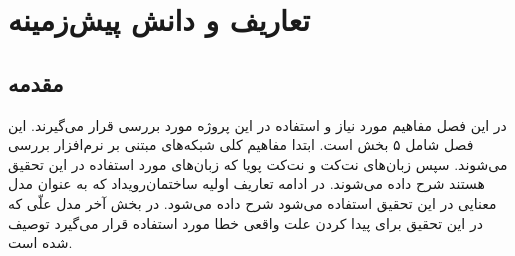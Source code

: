 \chapter{تعاریف و دانش پیش‌زمینه}
\section{مقدمه}
در این فصل مفاهیم مورد نیاز و استفاده در این پروژه مورد بررسی قرار می‌گیرند.
این فصل شامل ۵ بخش است.
ابتدا مفاهیم کلی شبکه‌های مبتنی بر نرم‌افزار بررسی می‌شوند.
سپس زبان‌های نت‌کت
و نت‌کت پویا
که زبان‌های مورد استفاده در این تحقیق هستند شرح داده می‌شوند.
در ادامه تعاریف اولیه ساختمان‌رویداد%
که به عنوان مدل معنایی در این تحقیق استفاده می‌شود شرح داده می‌شود.
در بخش آخر مدل علّی%
که در این تحقیق برای پیدا کردن علت واقعی خطا مورد استفاده قرار می‌گیرد توصیف شده است.











